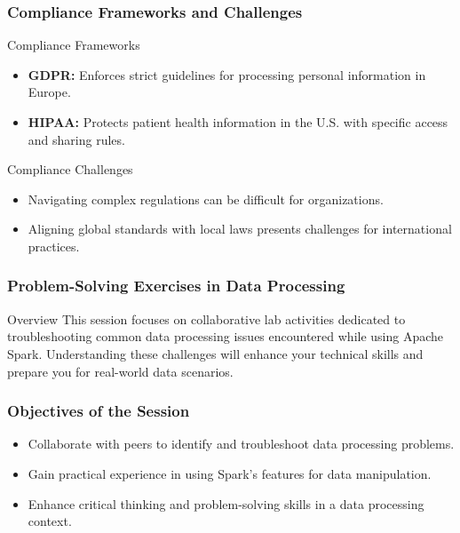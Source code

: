 \documentclass[aspectratio=169]{beamer}
\begin{document}
\begin{frame}[fragile]
    \frametitle{Compliance Frameworks and Challenges}

    \begin{block}{Compliance Frameworks}
        \begin{itemize}
            \item \textbf{GDPR:} Enforces strict guidelines for processing personal information in Europe.
            \item \textbf{HIPAA:} Protects patient health information in the U.S. with specific access and sharing rules.
        \end{itemize}
    \end{block}

    \begin{block}{Compliance Challenges}
        \begin{itemize}
            \item Navigating complex regulations can be difficult for organizations.
            \item Aligning global standards with local laws presents challenges for international practices.
        \end{itemize}
    \end{block}
\end{frame}

\begin{frame}[fragile]
    \frametitle{Problem-Solving Exercises in Data Processing}
    \begin{block}{Overview}
        This session focuses on collaborative lab activities dedicated to troubleshooting common data processing issues encountered while using Apache Spark.
        Understanding these challenges will enhance your technical skills and prepare you for real-world data scenarios.
    \end{block}
\end{frame}

\begin{frame}[fragile]
    \frametitle{Objectives of the Session}
    \begin{itemize}
        \item Collaborate with peers to identify and troubleshoot data processing problems.
        \item Gain practical experience in using Spark’s features for data manipulation.
        \item Enhance critical thinking and problem-solving skills in a data processing context.
    \end{itemize}
\end{frame}
\end{document}
